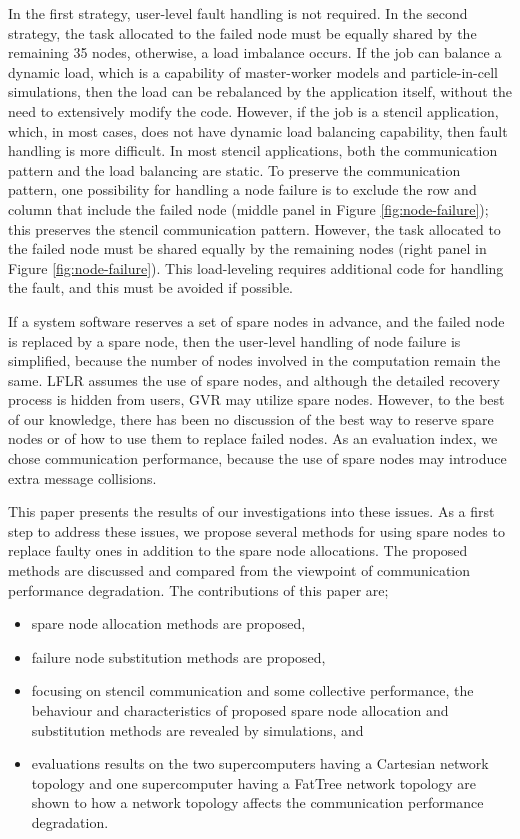 \documentclass[Afour,times,sagev]{sagej}
\begin{document}
In the first strategy, user-level fault handling is not required.
In the second strategy, the task allocated to the failed node must
be equally shared by the remaining 35 nodes, otherwise, a load
imbalance occurs. If the job can balance a dynamic load, which is a
capability of master-worker models and particle-in-cell simulations,
then the load can be rebalanced by the application itself, without the
need to extensively modify the code. However, if the job is a stencil
application, which, in most cases, does not have dynamic load
balancing capability, then fault handling is more difficult. In most
stencil applications, both the communication pattern and the load
balancing are static. To preserve the communication pattern, one
possibility for handling a node failure is to exclude the row and
column that include the failed node (middle panel in Figure
\ref{fig:node-failure}); this preserves the stencil communication
pattern. However, the task allocated to the failed node must be shared
equally by the remaining nodes (right panel in Figure
\ref{fig:node-failure}). This load-leveling requires additional code
for handling the fault, and this must be avoided if possible.

If a system software reserves a set of spare nodes in advance, and the
failed node is replaced by a spare node, then the user-level handling of
node failure is simplified, because the number of nodes involved in
the computation remain the same. LFLR assumes the use of spare nodes,
and although the detailed recovery process is hidden from users, GVR
may utilize spare nodes. However, to the best of our knowledge, there
has been no discussion of the best way to reserve spare nodes or of
how to use them to replace failed nodes. As an evaluation index, we
chose communication performance, because the use of spare nodes may
introduce extra message collisions.

This paper presents the results of our investigations into these
issues. As a first step to address these issues, we propose several
methods for using spare nodes to replace faulty ones in addition to
the spare node allocations. The proposed methods are discussed and
compared from the viewpoint of communication performance
degradation. The contributions of this paper are;  

\begin{itemize}
\item spare node allocation methods are proposed,
\item failure node substitution methods are proposed,
\item focusing on stencil communication and some collective
  performance, the behaviour and characteristics of proposed spare
  node allocation and substitution methods are revealed by simulations, and
\item evaluations results on the two supercomputers having a Cartesian
  network topology and one supercomputer having a FatTree network
  topology are shown to how a network topology affects the communication
  performance degradation.
\end{itemize}
\end{document}
